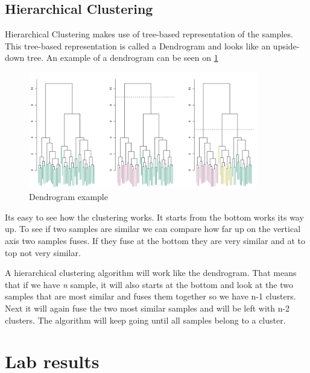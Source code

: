 \subsection{Hierarchical Clustering}
Hierarchical Clustering makes use of tree-based representation of the samples. This tree-based representation is called a Dendrogram and looks like an upside-down tree. An example of a dendrogram can be seen on \cref{fig:dendrogram}\cite{book_2015}


\begin{figure}[H]
	\centering
	\includegraphics[width=10cm]{Img/Dendrogram_example.PNG}
	\caption{Dendrogram example}
	\label{fig:dendrogram}
\end{figure} 

Its easy to see how the clustering works. It starts from the bottom works its way up. To see if two samples are similar we can compare how far up on the vertical axis two samples fuses. If they fuse at the bottom they are very similar and at to top not very similar. 

A hierarchical clustering algorithm will work like the dendrogram. That means that if we have \textit{n} sample, it will also starts at the bottom and look at the two samples that are most similar and fuses them together so we have n-1 clusters. Next it will again fuse the two most similar samples and will be left with n-2 clusters. The algorithm will keep going until all samples belong to a cluster. 
 


\section{Lab results}

